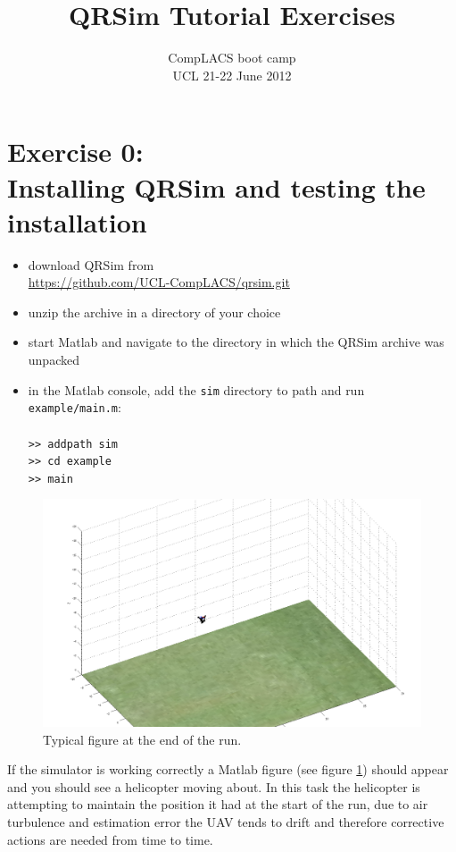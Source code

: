 \documentclass[a4paper,11pt]{article}
\title{QRSim Tutorial Exercises}
\author{{CompLACS} boot camp\\UCL 21-22 June 2012}
\date{}
\newcommand{\webrepo}{\url{https://github.com/UCL-CompLACS/qrsim.git}\xspace}
\begin{document}
\maketitle
\section*{Exercise 0:\\Installing QRSim and testing the installation}

\begin{itemize}
 \item download QRSim from \\\webrepo
 \item unzip the archive in a directory of your choice
 \item start Matlab and navigate to the directory in which the QRSim archive was unpacked
 \item in the Matlab console, add the \texttt{sim} directory to path and run \texttt{example/main.m}:\\
  \texttt{\\
  >> addpath sim\\
  >> cd example\\
  >> main}
\end{itemize}
\begin{figure}[!b]
\includegraphics[width=13cm]{fig/main.jpg}
 \caption{Typical figure at the end of the run.\label{fig:main}}
\end{figure}
If the simulator is working correctly a Matlab figure (see figure \ref{fig:main}) should appear and you should see a helicopter moving about. In this task the helicopter is attempting to maintain the position it had at the start of the run, due to air turbulence and estimation error the UAV tends to drift and therefore corrective actions are needed from time to time. 
\end{document}
